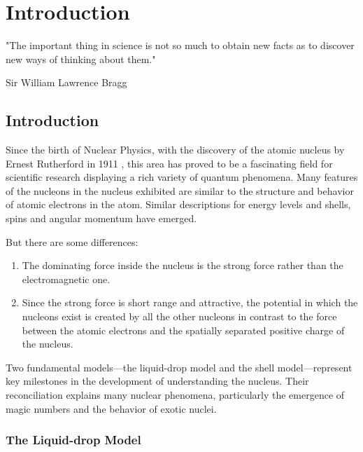 
%

\chapter{Introduction}
\label{cha:introduction}

\epigraph{
  "The important thing in science is not so much to obtain new facts as to discover new ways of thinking about them."
}{Sir William Lawrence Bragg}

\section{Introduction}

Since the birth of Nuclear Physics, with the discovery of the atomic nucleus by Ernest Rutherford in 1911 \cite{rutherford_lxxix_1911}, this area has proved to be a fascinating field for scientific research displaying a rich variety of quantum phenomena.
Many features of the nucleons in the nucleus exhibited are similar to the structure and behavior of atomic electrons in the atom. Similar descriptions for energy levels and shells, spins and angular momentum have emerged.

But there are some differences:
\begin{enumerate}
	\item The dominating force inside the nucleus is the strong force rather than the electromagnetic one.
	\item Since the strong force is short range and attractive, the potential in which the nucleons exist is created by all the other nucleons in contrast to the force between the atomic electrons and the spatially separated positive charge of the nucleus.
\end{enumerate}

Two fundamental models—the liquid-drop model and the shell model—represent key milestones in the development of understanding the nucleus. Their reconciliation explains many nuclear phenomena, particularly the emergence of magic numbers and the behavior of exotic nuclei.

\subsection{The Liquid-drop Model}

